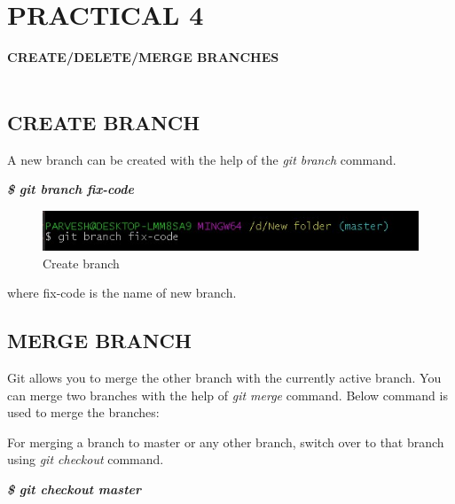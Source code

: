 \documentclass[12pt]{article}
\begin{document}
\section{PRACTICAL 4}

\textbf{\uppercase {Create/Delete/Merge Branches}} \\
\vspace{0.1\baselineskip} \\
 
\subsection{CREATE BRANCH}
A new branch can be created  with the help of the \emph{git branch} command.\\

\vspace{1 mm}

\textit{\textbf{\$ git branch fix-code}}\\

\vspace{1 mm}

\begin{figure}[H]
\centering
\includegraphics[scale=0.8]{f1}
\caption{Create branch}
\vspace{0.6\baselineskip}
\end{figure}	

where fix-code is the name of new branch.

\subsection{MERGE BRANCH}
Git allows you to merge the other branch with the currently active branch. You can merge two branches with the help of \emph{git merge} command. Below command is used to merge the branches:\\

\vspace{1 mm}

For merging a branch to master or any other branch, switch over to that branch using \emph{git checkout} command.\\
\vspace{1 mm}

\textit{\textbf{\$ git checkout master}}\\
\end{document}
